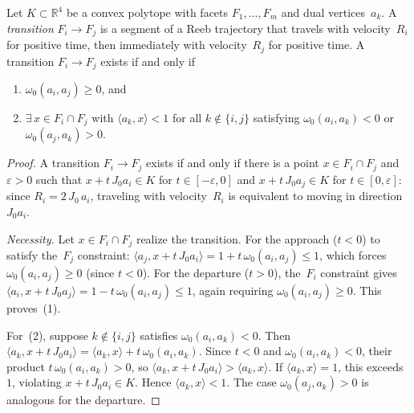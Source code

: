 \begin{unverified}
\begin{lemma}%
\label{lem:numerical-transition-feasibility}\label{lem:transition-feasibility}
Let $K \subset \mathbb{R}^4$ be a convex polytope with
facets $F_1, \ldots, F_m$ and dual vertices~$a_k$.
A \emph{transition} $F_i \to F_j$ is a segment of a
Reeb trajectory that travels with velocity~$R_i$
for positive time,
then immediately with velocity~$R_j$ for positive time.
A transition $F_i \to F_j$ exists if and only if
\begin{enumerate}
\item $\omega_0(a_i, a_j) \ge 0$, and
\item $\exists\, x \in F_i \cap F_j$ with
  $\langle a_k, x \rangle < 1$
  for all $k \notin \{i,j\}$ satisfying
  $\omega_0(a_i, a_k) < 0$ or
  $\omega_0(a_j, a_k) > 0$.
\end{enumerate}
\end{lemma}

\begin{proof}
A transition $F_i \to F_j$ exists if and only if
there is a point $x \in F_i \cap F_j$ and
$\varepsilon > 0$ such that
$x + t\, J_0 a_i \in K$ for $t \in [-\varepsilon, 0]$
and $x + t\, J_0 a_j \in K$ for $t \in [0, \varepsilon]$:
since $R_i = 2\, J_0\, a_i$,
traveling with velocity~$R_i$ is equivalent to
moving in direction~$J_0 a_i$.

\emph{Necessity.}
Let $x \in F_i \cap F_j$ realize the transition.
For the approach ($t < 0$) to satisfy
the~$F_j$ constraint:
$\langle a_j, x + t\, J_0 a_i \rangle
= 1 + t\,\omega_0(a_i, a_j) \leq 1$,
which forces $\omega_0(a_i, a_j) \geq 0$
(since $t < 0$).
For the departure ($t > 0$), the~$F_i$ constraint gives
$\langle a_i, x + t\, J_0 a_j \rangle
= 1 - t\,\omega_0(a_i, a_j) \leq 1$,
again requiring $\omega_0(a_i, a_j) \geq 0$.
This proves~(1).

For~(2), suppose $k \notin \{i,j\}$ satisfies
$\omega_0(a_i, a_k) < 0$.
Then
$\langle a_k, x + t\, J_0 a_i \rangle
= \langle a_k, x \rangle + t\,\omega_0(a_i, a_k)$.
Since $t < 0$ and $\omega_0(a_i, a_k) < 0$,
their product $t\,\omega_0(a_i, a_k) > 0$, so
$\langle a_k, x + t\, J_0 a_i \rangle
> \langle a_k, x \rangle$.
If $\langle a_k, x \rangle = 1$, this
exceeds~$1$, violating $x + t\, J_0 a_i \in K$.
Hence $\langle a_k, x \rangle < 1$.
The case $\omega_0(a_j, a_k) > 0$ is analogous
for the departure.


\end{proof}
\end{unverified}
